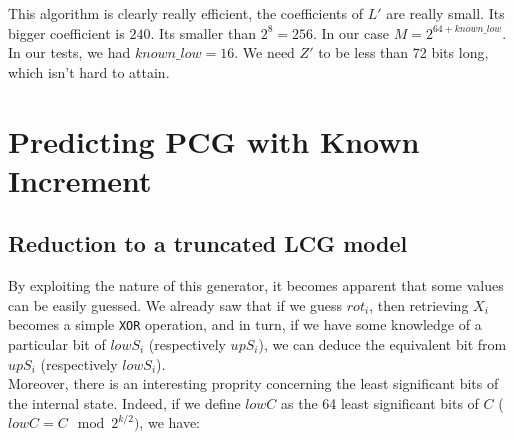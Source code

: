 \documentclass[preprint]{iacrtrans}
\begin{document}
This algorithm is clearly really efficient, the coefficients of $L'$ are really small. Its bigger coefficient is $240$. Its smaller than $2^8 = 256$. In our case $M = 2^{64 + known\_low}$. In our tests, we had $known\_low = 16$. We need $Z'$ to be less than 72 bits long, which isn't hard to attain.

\section{Predicting PCG with Known Increment}
\subsection{Reduction to a truncated LCG model}
By exploiting the nature of this generator, it becomes apparent that some values can be easily guessed. We already saw that if we guess $rot_i$, then retrieving $X_i$ becomes a simple \texttt{XOR} operation, and in turn, if we have some knowledge of a particular bit of $lowS_i$ (respectively $upS_i$), we can deduce the equivalent bit from $upS_i$ (respectively $lowS_i$).\\

Moreover, there is an interesting proprity concerning the least significant bits of the internal state. Indeed, if we define $lowC$ as the 64 least significant bits of $C$ ($lowC = C \mod{2^{k/2}})$, we have:
\end{document}
